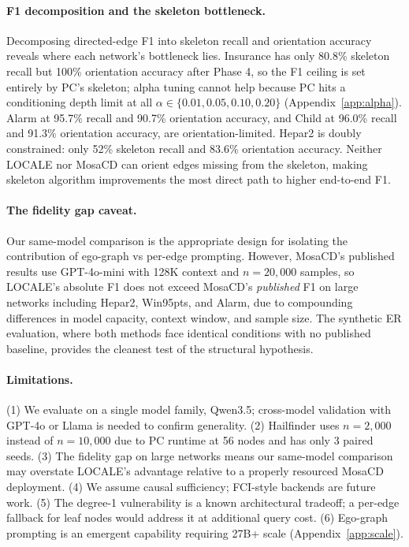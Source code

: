 \documentclass{article} %
\begin{document}
\paragraph{F1 decomposition and the skeleton bottleneck.}
Decomposing directed-edge F1 into skeleton recall and orientation accuracy reveals where each network's bottleneck lies. Insurance has only 80.8\% skeleton recall but 100\% orientation accuracy after Phase 4, so the F1 ceiling is set entirely by PC's skeleton; alpha tuning cannot help because PC hits a conditioning depth limit at all $\alpha \in \{0.01, 0.05, 0.10, 0.20\}$ (Appendix~\ref{app:alpha}). Alarm at 95.7\% recall and 90.7\% orientation accuracy, and Child at 96.0\% recall and 91.3\% orientation accuracy, are orientation-limited. Hepar2 is doubly constrained: only 52\% skeleton recall and 83.6\% orientation accuracy. Neither LOCALE nor MosaCD can orient edges missing from the skeleton, making skeleton algorithm improvements the most direct path to higher end-to-end F1.

\paragraph{The fidelity gap caveat.}
Our same-model comparison is the appropriate design for isolating the contribution of ego-graph vs per-edge prompting. However, MosaCD's published results use GPT-4o-mini with 128K context and $n{=}20{,}000$ samples, so LOCALE's absolute F1 does not exceed MosaCD's \textit{published} F1 on large networks including Hepar2, Win95pts, and Alarm, due to compounding differences in model capacity, context window, and sample size. The synthetic ER evaluation, where both methods face identical conditions with no published baseline, provides the cleanest test of the structural hypothesis.

\paragraph{Limitations.}
(1) We evaluate on a single model family, Qwen3.5; cross-model validation with GPT-4o or Llama is needed to confirm generality. (2) Hailfinder uses $n{=}2{,}000$ instead of $n{=}10{,}000$ due to PC runtime at 56 nodes and has only 3 paired seeds. (3) The fidelity gap on large networks means our same-model comparison may overstate LOCALE's advantage relative to a properly resourced MosaCD deployment. (4) We assume causal sufficiency; FCI-style backends are future work. (5) The degree-1 vulnerability is a known architectural tradeoff; a per-edge fallback for leaf nodes would address it at additional query cost. (6) Ego-graph prompting is an emergent capability requiring 27B+ scale (Appendix~\ref{app:scale}).
\end{document}
